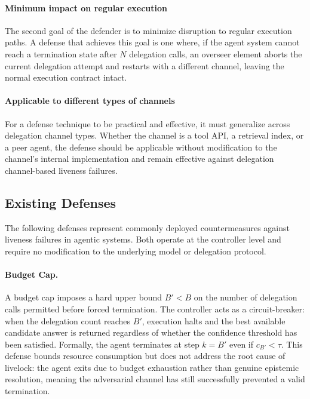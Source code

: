 \documentclass[conference]{IEEEtran}
\begin{document}
\paragraph{Minimum impact on regular execution}
The second goal of the defender is to minimize disruption to regular execution paths. A defense that achieves this goal is one where, if the agent system cannot reach a termination state after $N$ delegation calls, an overseer element aborts the current delegation attempt and restarts with a different channel, leaving the normal execution contract intact.

\paragraph{Applicable to different types of channels}
For a defense technique to be practical and effective, it must generalize across delegation channel types. Whether the channel is a tool API, a retrieval index, or a peer agent, the defense should be applicable without modification to the channel's internal implementation and remain effective against delegation channel-based liveness failures.

\subsection{Existing Defenses}

The following defenses represent commonly deployed countermeasures against liveness failures in agentic systems. Both operate at the controller level and require no modification to the underlying model or delegation protocol.

\paragraph{Budget Cap.}
A budget cap imposes a hard upper bound $B' < B$ on the number of delegation calls permitted before forced termination. The controller acts as a circuit-breaker: when the delegation count reaches $B'$, execution halts and the best available candidate answer is returned regardless of whether the confidence threshold has been satisfied. Formally, the agent terminates at step $k = B'$ even if $c_{B'} < \tau$. This defense bounds resource consumption but does not address the root cause of livelock: the agent exits due to budget exhaustion rather than genuine epistemic resolution, meaning the adversarial channel has still successfully prevented a valid termination.
\end{document}
